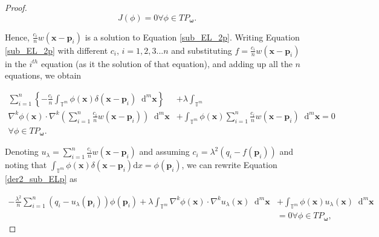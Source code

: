 \documentclass[multixcb]{amstext-l}
\theoremstyle{plain}
\theoremstyle{definition}
\theoremstyle{definition}
\theoremstyle{remark}
\numberwithin{equation}{chapter}
\begin{document}
\begin{appendix}
\begin{proof}
\begin{equation}
    J(\phi) = 0 \forall \phi\in TP_{\boldsymbol{\omega}}.
\end{equation}

Hence, $\frac{c_i}{n}w(\boldsymbol{x}-\boldsymbol{p}_i)$ is a solution to Equation \ref{sub_EL_2p}.  Writing Equation \ref{sub_EL_2p} with different $c_i$, $i = 1,2,3...n$ and substituting $f=\frac{c_i}{n}w(\boldsymbol{x}-\boldsymbol{p}_i)$ in the $i^{th}$ equation (as it the solution of that equation), and adding up all the $n$ equations, we obtain 

\begin{equation}
    \label{der2_sub_ELp}
    \begin{aligned}
     \sum\limits_{i=1}^n\left\{-\frac{c_i}{n}\int_{\mathbb{T}^m} \phi(\boldsymbol{x})\delta(\boldsymbol{x}-\boldsymbol{p}_i)\mathop{}\!\mathrm{d}^m\boldsymbol{x}\right\} &+ \lambda\int_{\mathbb{T}^m}\\ \nabla^k\phi(\boldsymbol{x})\cdot\nabla^k\left( \sum\limits_{i=1}^n \frac{c_i}{n}w(\boldsymbol{x}-\boldsymbol{p}_i)\right)\mathop{}\!\mathrm{d}^m\boldsymbol{x} &+ \int_{\mathbb{T}^m} \phi(\boldsymbol{x})\sum\limits_{i=1}^n \frac{c_i}{n}w(\boldsymbol{x}-\boldsymbol{p}_i)\mathop{}\!\mathrm{d}^m\boldsymbol{x} = 0\\ \forall \phi\in TP_{\boldsymbol{\omega}}.
     \end{aligned}
\end{equation}

Denoting $u_{\lambda} = \sum\limits_{i=1}^n \frac{c_i}{n}w(\boldsymbol{x}-\boldsymbol{p}_i)$ and assuming $c_i = \lambda^2(q_i-f(\boldsymbol{p}_i))$ and noting that $\int_{\mathbb{T}^m}\phi(\boldsymbol{x})\delta(\boldsymbol{x}-\boldsymbol{p}_i)\mathrm{d}x = \phi(\boldsymbol{p}_i)$, we can rewrite Equation \ref{der2_sub_ELp} as 

\begin{equation}
    \label{der3_sub_ELp}
    \begin{aligned}
      -\frac{\lambda^2}{n}\sum\limits_{i=1}^n (q_i-u_{\lambda}(\boldsymbol{p}_i))\phi(\boldsymbol{p}_i) + \lambda\int_{\mathbb{T}^m} \nabla^k\phi(\boldsymbol{x})\cdot\nabla^k u_{\lambda}(\boldsymbol{x})\mathop{}\!\mathrm{d}^m\boldsymbol{x} &+ \int_{\mathbb{T}^m} \phi(\boldsymbol{x})u_{\lambda}(\boldsymbol{x})\mathop{}\!\mathrm{d}^m\boldsymbol{x}\\
     &= 0 \forall \phi\in TP_{\boldsymbol{\omega}},
     \end{aligned}
\end{equation}


\end{proof}
\end{appendix}
\end{document}

